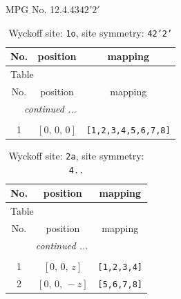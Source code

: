 \documentclass[fleqn,8pt]{jsarticle}
\begin{document}
\setcounter{MaxMatrixCols}{32}

\renewcommand{\tablename}{Table~}
\renewcommand{\figurename}{Figure~}
\begin{center}
\LARGE
MPG No. 12.4.43\quad$42'2'$
\end{center}
\renewcommand{\arraystretch}{1.2}
\begin{longtable}{ccc}
\caption{Wyckoff site: {\tt 1o}, site symmetry: {\tt 42'2'}}
 \\
 \hline \hline
No. & position & mapping \\ \hline \endfirsthead

\multicolumn{2}{l}{\tablename\ \thetable{}} \\
 \hline \hline
No. & position & mapping \\ \hline \endhead

 \hline \hline
\multicolumn{2}{r}{\footnotesize\it continued ...} \\ \endfoot

 \hline \hline
\multicolumn{2}{r}{} \\ \endlastfoot

1 & $\left[ 0,\, 0,\, 0 \right]$ & {\tt [1,2,3,4,5,6,7,8]} \\
\end{longtable}
\renewcommand{\arraystretch}{1.2}
\begin{longtable}{ccc}
\caption{Wyckoff site: {\tt 2a}, site symmetry: {\tt 4..}}
 \\
 \hline \hline
No. & position & mapping \\ \hline \endfirsthead

\multicolumn{2}{l}{\tablename\ \thetable{}} \\
 \hline \hline
No. & position & mapping \\ \hline \endhead

 \hline \hline
\multicolumn{2}{r}{\footnotesize\it continued ...} \\ \endfoot

 \hline \hline
\multicolumn{2}{r}{} \\ \endlastfoot

1 & $\left[ 0,\, 0,\, z \right]$ & {\tt [1,2,3,4]} \\ \hline
2 & $\left[ 0,\, 0,\, - z \right]$ & {\tt [5,6,7,8]} \\
\end{longtable}
\renewcommand{\arraystretch}{1.2}
\end{document}
